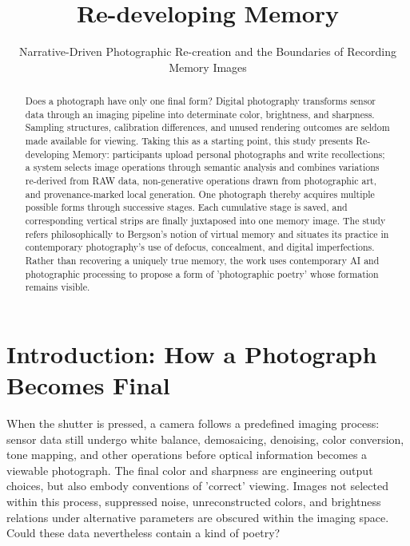\documentclass[manuscript,review,anonymous,authoryear]{acmart}
\title{Re-developing Memory}
\subtitle{Narrative-Driven Photographic Re-creation and the Boundaries of Recording Memory Images}
\begin{document}
\begin{abstract}

Does a photograph have only one final form? Digital photography transforms sensor data through an imaging pipeline into determinate color, brightness, and sharpness. Sampling structures, calibration differences, and unused rendering outcomes are seldom made available for viewing. Taking this as a starting point, this study presents Re-developing Memory: participants upload personal photographs and write recollections; a system selects image operations through semantic analysis and combines variations re-derived from RAW data, non-generative operations drawn from photographic art, and provenance-marked local generation. One photograph thereby acquires multiple possible forms through successive stages. Each cumulative stage is saved, and corresponding vertical strips are finally juxtaposed into one memory image. The study refers philosophically to Bergson's notion of virtual memory and situates its practice in contemporary photography's use of defocus, concealment, and digital imperfections. Rather than recovering a uniquely true memory, the work uses contemporary AI and photographic processing to propose a form of 'photographic poetry' whose formation remains visible.

\end{abstract}


\maketitle

\section{Introduction: How a Photograph Becomes Final}

When the shutter is pressed, a camera follows a predefined imaging process: sensor data still undergo white balance, demosaicing, denoising, color conversion, tone mapping, and other operations before optical information becomes a viewable photograph. The final color and sharpness are engineering output choices, but also embody conventions of 'correct' viewing. Images not selected within this process, suppressed noise, unreconstructed colors, and brightness relations under alternative parameters are obscured within the imaging space. Could these data nevertheless contain a kind of poetry?
\end{document}
